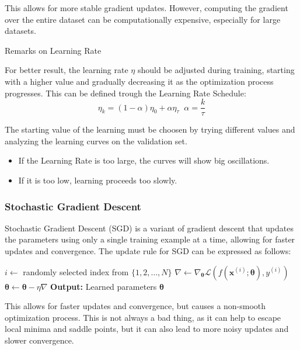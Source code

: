 This allows for more stable gradient updates. However, computing the gradient over the entire dataset can be computationally expensive, especially for large datasets.

\begin{definition}{Remarks on Learning Rate}
    {
        For better result, the learning rate $\eta$ should be adjusted during training, starting with a higher 
        value and gradually decreasing it as the optimization process progresses.
        This can be defined trough the Learning Rate Schedule:
        \begin{equation*}
            \eta_k = (1 - \alpha)\eta_0 + \alpha \eta_{\tau}\;\;\alpha = \frac{k}{\tau}
        \end{equation*}
        
        The starting value of the learning must be choosen by trying different values and analyzing the 
        learning curves on the validation set.
        \begin{itemize}
            \item If the Learning Rate is too large, the curves will show big oscillations.
            \item If it is too low, learning proceeds too slowly.
        \end{itemize}
    }
\end{definition}

\subsubsection*{Stochastic Gradient Descent}
Stochastic Gradient Descent (SGD) is a variant of gradient descent that updates the parameters using only a single training example at a time, allowing for faster updates and convergence.
The update rule for SGD can be expressed as follows:
\begin{algorithm}[H]
    \caption{Stochastic Gradient Descent}
    \begin{algorithmic}[1]
            \State $i \leftarrow$ randomly selected index from $\{1, 2, \ldots, N\}$
            \State $\nabla \leftarrow \nabla_{\boldsymbol{\theta}} \mathcal{L}(f(\boldsymbol{x}^{(i)}; \boldsymbol{\theta}), y^{(i)})$
            \State $\boldsymbol{\theta} \leftarrow \boldsymbol{\theta} - \eta \nabla$
        \EndWhile
        \State \textbf{Output:} Learned parameters $\boldsymbol{\theta}$
    \end{algorithmic}
\end{algorithm}
This allows for faster updates and convergence, but causes a non-smooth optimization process.
This is not always a bad thing, as it can help to escape local minima and saddle points, but it can also lead to more noisy updates and slower convergence.

